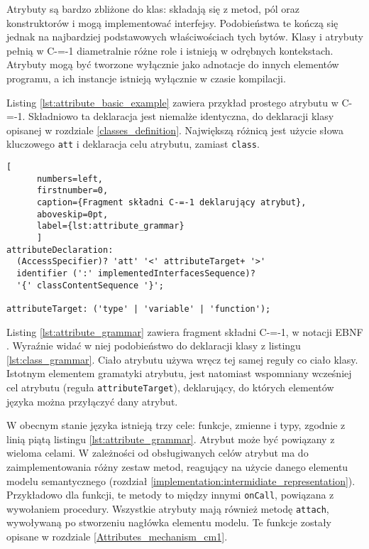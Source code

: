 Atrybuty są bardzo zbliżone do klas: składają się z metod, pól oraz konstruktorów i mogą implementować interfejsy.
Podobieństwa te kończą się jednak na najbardziej podstawowych właściwościach tych bytów.
Klasy i atrybuty pełnią w C-=-1 diametralnie różne role i istnieją w odrębnych kontekstach.
Atrybuty mogą być tworzone wyłącznie jako adnotacje do innych elementów programu, a ich instancje istnieją wyłącznie w czasie kompilacji.

Listing \ref{lst:attribute_basic_example} zawiera przykład prostego atrybutu w C-=-1.
Składniowo ta deklaracja jest niemalże identyczna, do deklaracji klasy opisanej w rozdziale \ref{classes_definition}.
Największą różnicą jest użycie słowa kluczowego \lstinline{att} i deklaracja celu atrybutu, zamiast \lstinline{class}.

\begin{minipage}{\linewidth}
  
	\begin{lstlisting}[
	  numbers=left,
	  firstnumber=0,
	  caption={Fragment składni C-=-1 deklarujący atrybut},
	  aboveskip=0pt,
	  label={lst:attribute_grammar}
	  ]
attributeDeclaration: 
  (AccessSpecifier)? 'att' '<' attributeTarget+ '>' 
  identifier (':' implementedInterfacesSequence)?
  '{' classContentSequence '}';

attributeTarget: ('type' | 'variable' | 'function');
  \end{lstlisting}
  \end{minipage}

Listing \ref{lst:attribute_grammar} zawiera fragment składni C-=-1, w notacji EBNF \cite{ebnf}.
Wyraźnie widać w niej podobieństwo do deklaracji klasy z listingu \ref{lst:class_grammar}.
Ciało atrybutu używa wręcz tej samej reguły co ciało klasy.
Istotnym elementem gramatyki atrybutu, jest natomiast wspomniany wcześniej cel atrybutu (reguła \lstinline{attributeTarget}), deklarujący, do których elementów języka można przyłączyć dany atrybut.

W obecnym stanie języka istnieją trzy cele: funkcje, zmienne i typy, zgodnie z linią piątą listingu \ref{lst:attribute_grammar}.
Atrybut może być powiązany z wieloma celami.
W zależności od obsługiwanych celów atrybut ma do zaimplementowania różny zestaw metod, reagujący na użycie danego elementu modelu semantycznego (rozdział \ref{implementation:intermidiate_representation}).
Przykładowo dla funkcji, te metody to między innymi \lstinline{onCall}, powiązana z wywołaniem procedury.
Wszystkie atrybuty mają również metodę \lstinline{attach}, wywoływaną po stworzeniu nagłówka elementu modelu.
Te funkcje zostały opisane w rozdziale \ref{Attributes_mechanism_cm1}.

